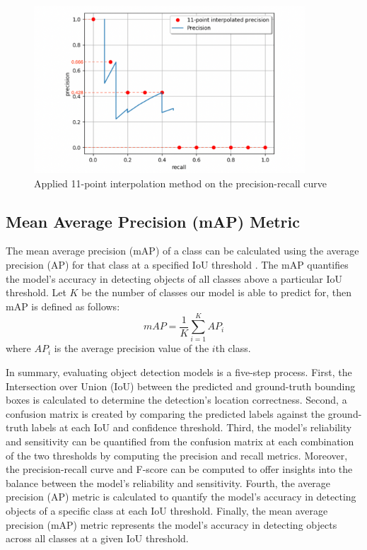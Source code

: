 \begin{figure}[!ht]
    \centering
    \includegraphics[width=4in]{figures/11AP_ex.png}
    \caption{Applied 11-point interpolation method on the precision-recall curve \cite{metrics_survey_2020}}
    \label{fig:11AP_ex}
\end{figure}

\subsection{Mean Average Precision (mAP) Metric}  \label{subsec:mean_ap_metric}
The mean average precision (mAP) of a class can be calculated using the average precision (AP) for that class at a specified IoU threshold \cite{szeliski_cv_book}. The mAP quantifies the model's accuracy in detecting objects of all classes above a particular IoU threshold. Let $K$ be the number of classes our model is able to predict for, then mAP is defined as follows:
\begin{equation}
    mAP = \frac{1}{K} \sum_{i=1}^{K}AP_i
\end{equation}
where $AP_i$ is the average precision value of the $i$th class.

In summary, evaluating object detection models is a five-step process. First, the Intersection over Union (IoU) between the predicted and ground-truth bounding boxes is calculated to determine the detection's location correctness. Second, a confusion matrix is created by comparing the predicted labels against the ground-truth labels at each IoU and confidence threshold. Third, the model's reliability and sensitivity can be quantified from the confusion matrix at each combination of the two thresholds by computing the precision and recall metrics. Moreover, the precision-recall curve and F-score can be computed to offer insights into the balance between the model's reliability and sensitivity. Fourth, the average precision (AP) metric is calculated to quantify the model's accuracy in detecting objects of a specific class at each IoU threshold. Finally, the mean average precision (mAP) metric represents the model's accuracy in detecting objects across all classes at a given IoU threshold. 

